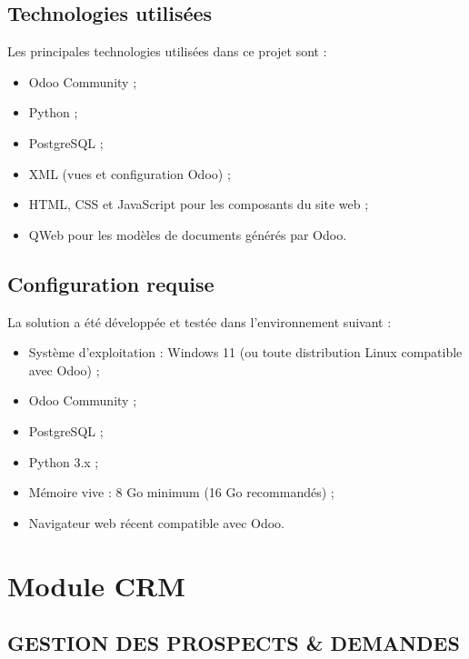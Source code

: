 \documentclass[12pt,a4paper]{report}
\begin{document}
\section{Technologies utilisées}

Les principales technologies utilisées dans ce projet sont :

\begin{itemize}
    \item Odoo Community ;
    \item Python ;
    \item PostgreSQL ;
    \item XML (vues et configuration Odoo) ;
    \item HTML, CSS et JavaScript pour les composants du site web ;
    \item QWeb pour les modèles de documents générés par Odoo.
\end{itemize}

\section{Configuration requise}

La solution a été développée et testée dans l'environnement suivant :

\begin{itemize}
    \item Système d'exploitation : Windows 11 (ou toute distribution Linux compatible avec Odoo) ;
    \item Odoo Community ;
    \item PostgreSQL ;
    \item Python 3.x ;
    \item Mémoire vive : 8 Go minimum (16 Go recommandés) ;
    \item Navigateur web récent compatible avec Odoo.
\end{itemize}


\chapter{Module CRM}
\section{GESTION DES PROSPECTS \& DEMANDES}
\end{document}
